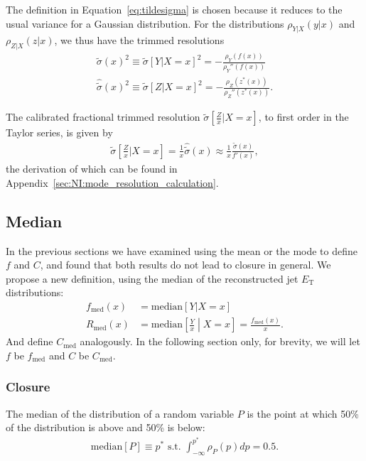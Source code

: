 \noindent The definition in Equation~\ref{eq:tildesigma} is chosen because it reduces to the usual variance for a Gaussian distribution.  For the distributions $\rho_{Y|X}(y|x)$ and $\rho_{Z|X}(z|x)$, we thus have the trimmed resolutions
\begin{align}
\tilde{\sigma}(x)^2\equiv\tilde{\sigma}\left[Y|X=x\right]^2 = -\frac{\rho_Y(f(x))}{\rho_Y''(f(x))} \\
\hat{\tilde{\sigma}}(x)^2\equiv\tilde{\sigma}\left[Z|X=x\right]^2 = -\frac{\rho_Z(z^*(x))}{\rho_Z''(z^*(x))}.
\label{mode_resolution_def}
\end{align}

\noindent The calibrated fractional trimmed resolution $\tilde{\sigma}\left[\frac{Z}{x}|X=x\right]$, to first order in the Taylor series, is given by
\begin{align}
\tilde{\sigma}\left[\frac{Z}{x}|X=x\right] = \frac{1}{x}\hat{\tilde{\sigma}}(x) \approx \frac{1}{x}\frac{\tilde{\sigma}(x)}{f'(x)},
\label{eqn:NI:resolutionmode_text}
\end{align}
the derivation of which can be found in Appendix~\ref{sec:NI:mode_resolution_calculation}.

\subsection{Median}
\label{sec:NI:median}
In the previous sections we have examined using the mean or the mode to define $f$ and $C$, and found that both results do not lead to closure in general. We propose a new definition, using the median of the reconstructed jet $E_\text{T}$ distributions:
\begin{align}
f_\text{med}(x)&=\text{median}[Y|X=x]\\
R_\text{med}(x) &= \text{median}\left[\frac{Y}{x}\middle| X=x\right] = \frac{f_\text{med}(x)}{x}. 
\end{align}
And define $C_\text{med}$ analogously.  In the following section only, for brevity, we will let $f$ be $f_\text{med}$ and $C$ be $C_\text{med}$.

\subsubsection{Closure}
\label{sec:NI:medianclosuresection}
The median of the distribution of a random variable $P$ is the point at which 50\% of the distribution is above and 50\% is below:
\begin{align}
  \text{median}[P] \equiv p^* \text{ s.t. } \int_{-\infty}^{p^*} \rho_P(p) dp = 0.5.
\end{align}

